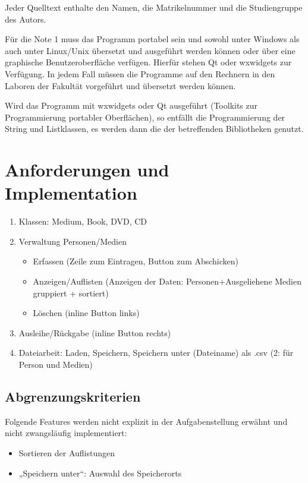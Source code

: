 Jeder Quelltext enthalte den Namen, die Matrikelnummer und die Studiengruppe des Autors.

Für die Note 1 muss das Programm portabel sein und sowohl unter Windows als auch unter Linux/Unix übersetzt und ausgeführt werden können oder über eine graphische Benutzeroberfläche verfügen. Hierfür stehen Qt oder wxwidgets zur Verfügung. In jedem Fall müssen die Programme auf den Rechnern in den Laboren der Fakultät vorgeführt und übersetzt werden können.

Wird das Programm mit wxwidgets oder Qt ausgeführt (Toolkits zur Programmierung portabler Oberflächen), so entfällt die Programmierung der String und Listklassen, es werden dann die der betreffenden Bibliotheken genutzt.

\section*{Anforderungen und Implementation}
\begin{enumerate}
\item Klassen: Medium, Book, DVD, CD
\item Verwaltung Personen/Medien
\begin{itemize}
\item Erfassen (Zeile zum Eintragen, Button zum Abschicken)
\item Anzeigen/Auflisten (Anzeigen der Daten: Personen+Ausgeliehene Medien gruppiert + sortiert)
\item Löschen (inline Button links)
\end{itemize}
\item Ausleihe/Rückgabe (inline Button rechts)
\item Dateiarbeit: Laden, Speichern, Speichern unter (Dateiname) als .csv (2: für Person und Medien)
\end{enumerate}

\subsection*{Abgrenzungskriterien}
Folgende Features werden nicht explizit in der Aufgabenstellung erwähnt und nicht zwangsläufig implementiert:
\begin{itemize}
\item Sortieren der Auflistungen
\item „Speichern unter“: Auswahl des Speicherorts
\end{itemize}

